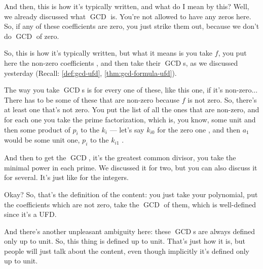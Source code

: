 \begin{speech}[00:02:55 - 00:04:53]
And then, this is how it's typically written, and what do I mean by this? Well, we already discussed what $\operatorname{GCD}$ is. You're not allowed to have any zeros here. So, if any of these coefficients are zero, you just strike them out, because we don't do $\operatorname{GCD}$ of zero.

So, this is how it's typically written, but what it means is you take $f$, you put here the non-zero coefficients , and then take their $\operatorname{GCD}$s, as we discussed yesterday (Recall: \cref{def:gcd-ufd}, \cref{thm:gcd-formula-ufd}).

The way you take $\operatorname{GCD}$s is for every one of these, like this one, if it's non-zero... There has to be some of these that are non-zero because $f$ is not zero. So, there's at least one that's not zero. You put the list of all the ones that are non-zero, and for each one you take the prime factorization, which is, you know, some unit and then some product of $p_i$ to the $k_i$ --- let's say $k_{i0}$ for the zero one , and then $a_1$ would be some unit one, $p_i$ to the $k_{i1}$ .

And then to get the $\operatorname{GCD}$, it's the greatest common divisor, you take the minimal power in each prime. We discussed it for two, but you can also discuss it for several. It's just like for the integers.

Okay? So, that's the definition of the content: you just take your polynomial, put the coefficients which are not zero, take the $\operatorname{GCD}$ of them, which is well-defined since it's a UFD.

And there's another unpleasant ambiguity here: these $\operatorname{GCD}$s are always defined only up to unit. So, this thing is defined up to unit.  That's just how it is, but people will just talk about the content, even though implicitly it's defined only up to unit.
\end{speech}

